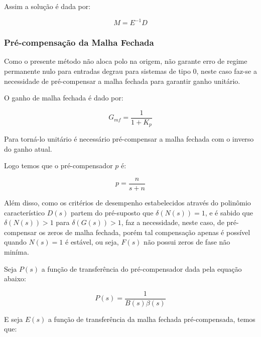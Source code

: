 \documentclass[conference,harvard,brazil,english]{sbatex}
\begin{document}
            Assim a solução é dada por:
            
            \begin{equation}
                M = E^{-1}D
            \end{equation}
            
        \subsubsection{Pré-compensação da Malha Fechada}
            
            Como o presente método não aloca polo na origem, não garante erro de regime permanente nulo para entradas degrau para sistemas de tipo 0, neste caso faz-se a necessidade de pré-compensar a malha fechada para garantir ganho unitário.
            
            O ganho de malha fechada é dado por:
            
            \begin{equation}
                G_{mf} = \frac{1}{1 + K_p}
            \end{equation}
            
            Para torná-lo unitário é necessário pré-compensar a malha fechada com o inverso do ganho atual.
            
            Logo temos que o pré-compensador $p$ é:
            
            \begin{equation}
            \label{equ:precompensador}
             p = \frac{n}{s+n}
            \end{equation}
            
            Além disso, como os critérios de desempenho estabelecidos através do polinômio característico $D(s)$ partem do pré-suposto que $\delta(N(s))=1$, e é sabido que $\delta(N(s))>1$ para $\delta(G(s))>1$, faz a necessidade, neste caso, de pré-compensar os zeros de malha fechada, porém tal compensação apenas é possível quando  $N(s)=1$ é estável, ou seja, $F(s)$ não possui zeros de fase não miníma.
            
            Seja $P(s)$ a função de transferência do pré-compensador dada pela equação abaixo:
            
            \begin{equation}
                P(s) = \frac{1}{B(s) \beta(s)}
            \end{equation}
            
            E seja $E(s)$ a função de transferência da malha fechada pré-compensada, temos que:
            
\end{document}
